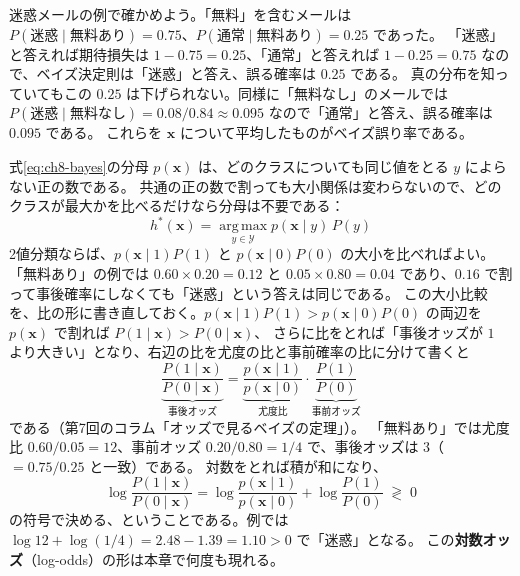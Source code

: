 迷惑メールの例で確かめよう。「無料」を含むメールは $P(\text{迷惑} \mid \text{無料あり}) = 0.75$、$P(\text{通常} \mid \text{無料あり}) = 0.25$ であった。
「迷惑」と答えれば期待損失は $1 - 0.75 = 0.25$、「通常」と答えれば $1 - 0.25 = 0.75$ なので、ベイズ決定則は「迷惑」と答え、誤る確率は $0.25$ である。
真の分布を知っていてもこの $0.25$ は下げられない。同様に「無料なし」のメールでは $P(\text{迷惑} \mid \text{無料なし}) = 0.08/0.84 \approx 0.095$ なので「通常」と答え、誤る確率は $0.095$ である。
これらを $\bm{x}$ について平均したものがベイズ誤り率である。

式\eqref{eq:ch8-bayes}の分母 $p(\bm{x})$ は、どのクラスについても同じ値をとる $y$ によらない正の数である。
共通の正の数で割っても大小関係は変わらないので、どのクラスが最大かを比べるだけなら分母は不要である：
\begin{equation}
  h^*(\bm{x}) = \operatorname*{arg\,max}_{y \in \mathcal{Y}} p(\bm{x} \mid y)\,P(y)
  \label{eq:ch8-bayes-rule2}
\end{equation}
2値分類ならば、$p(\bm{x} \mid 1)P(1)$ と $p(\bm{x} \mid 0)P(0)$ の大小を比べればよい。
「無料あり」の例では $0.60 \times 0.20 = 0.12$ と $0.05 \times 0.80 = 0.04$ であり、$0.16$ で割って事後確率にしなくても「迷惑」という答えは同じである。
この大小比較を、比の形に書き直しておく。$p(\bm{x} \mid 1)P(1) > p(\bm{x} \mid 0)P(0)$ の両辺を $p(\bm{x})$ で割れば $P(1 \mid \bm{x}) > P(0 \mid \bm{x})$、
さらに比をとれば「事後オッズが $1$ より大きい」となり、右辺の比を尤度の比と事前確率の比に分けて書くと
\begin{equation}
  \underbrace{\frac{P(1 \mid \bm{x})}{P(0 \mid \bm{x})}}_{\text{事後オッズ}}
  = \underbrace{\frac{p(\bm{x} \mid 1)}{p(\bm{x} \mid 0)}}_{\text{尤度比}}
  \cdot \underbrace{\frac{P(1)}{P(0)}}_{\text{事前オッズ}}
  \label{eq:ch8-odds-rule}
\end{equation}
である（第7回のコラム「オッズで見るベイズの定理」）。
「無料あり」では尤度比 $0.60/0.05 = 12$、事前オッズ $0.20/0.80 = 1/4$ で、事後オッズは $3$（$= 0.75/0.25$ と一致）である。
対数をとれば積が和になり、
\begin{equation}
  \log \frac{P(1 \mid \bm{x})}{P(0 \mid \bm{x})}
  = \log \frac{p(\bm{x} \mid 1)}{p(\bm{x} \mid 0)} + \log \frac{P(1)}{P(0)}
  \;\gtrless\; 0
  \label{eq:ch8-log-odds-rule}
\end{equation}
の符号で決める、ということである。例では $\log 12 + \log(1/4) = 2.48 - 1.39 = 1.10 > 0$ で「迷惑」となる。
この\textbf{対数オッズ}（log-odds）の形は本章で何度も現れる。

